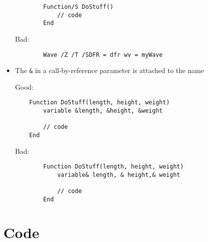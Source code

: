 \documentclass{scrartcl}
\begin{document}
\begin{itemize}
\begin{verbatim}
		Function/S DoStuff()
			// code
		End
	\end{verbatim}
	Bad:
	\begin{verbatim}
		Wave /Z /T /SDFR = dfr wv = myWave
	\end{verbatim}
%
	\item The \texttt{&} in a call-by-reference parameter is attached to the name\par
	Good:
	\begin{verbatim}
	Function DoStuff(length, height, weight)
		variable &length, &height, &weight

		// code
	End
	\end{verbatim}
	Bad:
	\begin{verbatim}
		Function DoStuff(length, height, weight)
			variable& length, & height,& weight

			// code
		End
	\end{verbatim}
%
\end{itemize}
%
\section{Code}
%
\end{document}
